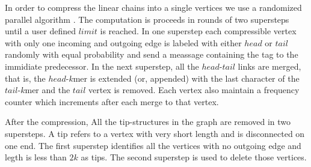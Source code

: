 \documentclass[conference]{IEEEtran}
\begin{document}
In order to compress the linear chains into a single vertices we use a randomized parallel algorithm \cite{algo:parallellistrank}.
The computation is proceeds in rounds of two supersteps until a user defined $limit$ is reached.
In one superstep each compressible vertex with only one incoming and outgoing edge is labeled with either $head$ or $tail$ randomly with equal probability and send a meassage containing the tag to the immidiate predecessor.
In the next superstep, all the $head$-$tail$ links are merged, that is, the $head$-$k$mer is extended (or, appended) with the last character of the $tail$-$k$mer and the $tail$ vertex is removed.
Each vertex also maintain a frequency counter which increments after each merge to that vertex.

After the compression, All the tip-structures in the graph are removed in two supersteps.
A tip refers to a vertex with very short length and is disconnected on one end.
The first superstep identifies all the vertices with no outgoing edge and  legth is less than $2k$ as tips.
The second superstep is used to delete those vertices.
\end{document}
